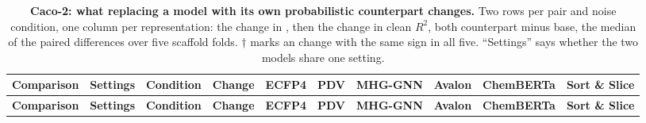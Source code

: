 
{\scriptsize
\begin{longtable}{llllcccccc}
\caption{\textbf{\SuppFile{} Caco-2: what replacing a model with its own probabilistic counterpart changes.}
Two rows per pair and noise condition, one column per representation: the change in \aucnorm{}, then the change in clean $R^2$, both counterpart minus base, the median of the paired differences over five scaffold folds. $\dagger$ marks an \aucnorm{} change with the same sign in all five. ``Settings'' says whether the two models share one setting.}
\label{supp:counterparts_caco2}\\
\toprule
\textbf{Comparison} & \textbf{Settings} & \textbf{Condition} & \textbf{Change} & \textbf{ECFP4} & \textbf{PDV} & \textbf{MHG-GNN} & \textbf{Avalon} & \textbf{ChemBERTa} & \textbf{Sort \& Slice} \\
\midrule
\endfirsthead
\toprule
\textbf{Comparison} & \textbf{Settings} & \textbf{Condition} & \textbf{Change} & \textbf{ECFP4} & \textbf{PDV} & \textbf{MHG-GNN} & \textbf{Avalon} & \textbf{ChemBERTa} & \textbf{Sort \& Slice} \\
\midrule
\endhead

\bottomrule
\end{longtable}}
